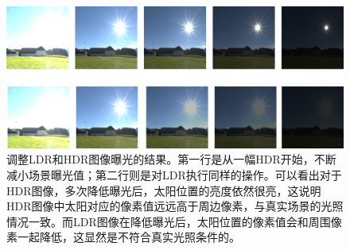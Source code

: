 \begin{figure}[htbp]
    \centering
    \includegraphics[width=1.0\textwidth]{Img/exposure-change.png}
    \caption[LDR图片与HDR图片在调整曝光时的不同]
    {调整LDR和HDR图像曝光的结果。第一行是从一幅HDR开始，不断减小场景曝光值；第二行则是对LDR执行同样的操作。可以看出对于HDR图像，多次降低曝光后，太阳位置的亮度依然很亮，这说明HDR图像中太阳对应的像素值远远高于周边像素，与真实场景的光照情况一致。而LDR图像在降低曝光后，太阳位置的像素值会和周围像素一起降低，这显然是不符合真实光照条件的。}
    \label{fig:exposure-change}
\end{figure}